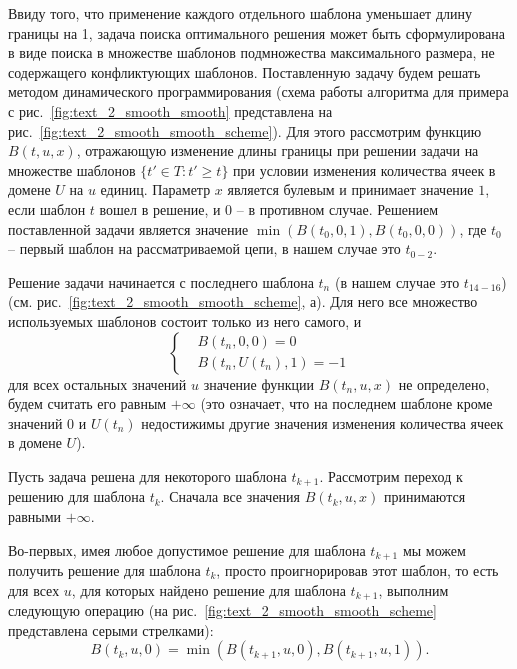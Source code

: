 Ввиду того, что применение каждого отдельного шаблона уменьшает длину границы на 1, задача поиска оптимального решения может быть сформулирована в виде поиска в множестве шаблонов подмножества максимального размера, не содержащего конфликтующих шаблонов.
Поставленную задачу будем решать методом динамического программирования (схема работы алгоритма для примера с рис.~\ref{fig:text_2_smooth_smooth} представлена на рис.~\ref{fig:text_2_smooth_smooth_scheme}).
Для этого рассмотрим функцию $B(t, u, x)$, отражающую изменение длины границы при решении задачи на множестве шаблонов $\{ t' \in T : t' \ge t \}$ при условии изменения количества ячеек в домене $U$ на $u$ единиц.
Параметр $x$ является булевым и принимает значение $1$, если шаблон $t$ вошел в решение, и $0$ -- в противном случае.
Решением поставленной задачи является значение $\min(B(t_0, 0, 1), B(t_0, 0, 0))$, где $t_0$ -- первый шаблон на рассматриваемой цепи, в нашем случае это $t_{0-2}$.

Решение задачи начинается с последнего шаблона $t_n$ (в нашем случае это $t_{14-16}$) (см. рис.~\ref{fig:text_2_smooth_smooth_scheme}, а).
Для него все множество используемых шаблонов состоит только из него самого, и
\begin{equation}
	\left\{
		\begin{aligned}
			& B(t_n, 0, 0) = 0 \\
			& B(t_n, U(t_n), 1) = -1
		\end{aligned}
	\right.
\end{equation}
для всех остальных значений $u$ значение функции $B(t_n, u, x)$ не определено, будем считать его равным $+\infty$ (это означает, что на последнем шаблоне кроме значений $0$ и $U(t_n)$ недостижимы другие значения изменения количества ячеек в домене $U$).

Пусть задача решена для некоторого шаблона $t_{k + 1}$.
Рассмотрим переход к решению для шаблона $t_k$.
Сначала все значения $B(t_k, u, x)$ принимаются равными $+\infty$.

Во-первых, имея любое допустимое решение для шаблона $t_{k + 1}$ мы можем получить решение для шаблона $t_k$, просто проигнорировав этот шаблон, то есть для всех $u$, для которых найдено решение для шаблона $t_{k + 1}$, выполним следующую операцию (на рис.~\ref{fig:text_2_smooth_smooth_scheme} представлена серыми стрелками):
\begin{equation}
	B(t_k, u, 0) = \min \left( B(t_{k + 1}, u, 0), B(t_{k + 1}, u, 1) \right).
\end{equation}


